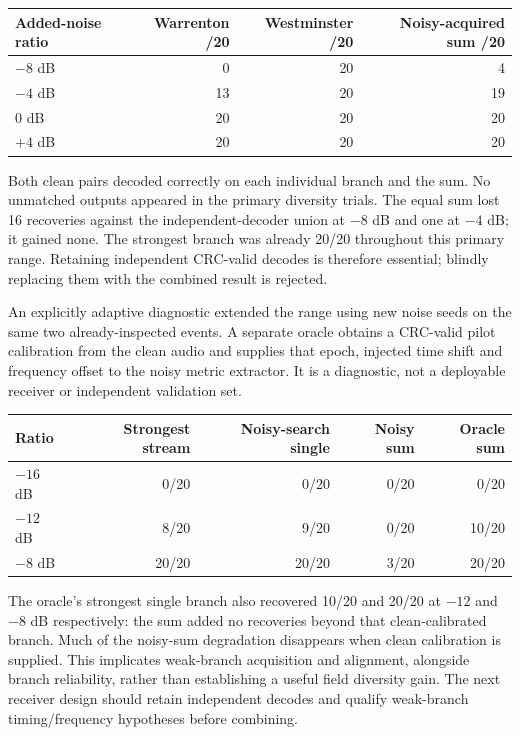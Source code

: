 \documentclass[11pt,a4paper]{article}
\begin{document}
\begin{center}
\begin{tabular}{lrrr}
\toprule
Added-noise ratio & Warrenton /20 & Westminster /20 & Noisy-acquired sum /20 \\
\midrule
$-8$ dB & 0 & 20 & 4 \\
$-4$ dB & 13 & 20 & 19 \\
0 dB & 20 & 20 & 20 \\
$+4$ dB & 20 & 20 & 20 \\
\bottomrule
\end{tabular}
\end{center}

Both clean pairs decoded correctly on each individual branch and the sum.
No unmatched outputs appeared in the primary diversity trials. The equal sum
lost 16 recoveries against the independent-decoder union at $-8$ dB and one
at $-4$ dB; it gained none. The strongest branch was already 20/20 throughout
this primary range. Retaining independent CRC-valid decodes is therefore
essential; blindly replacing them with the combined result is rejected.

An explicitly adaptive diagnostic extended the range using new noise seeds
on the same two already-inspected events. A separate oracle obtains a
CRC-valid pilot calibration from the clean audio and supplies that epoch,
injected time shift and frequency offset to the noisy metric extractor.
It is a diagnostic, not a deployable receiver or independent validation set.

\begin{center}
\begin{tabular}{lrrrr}
\toprule
Ratio & Strongest stream & Noisy-search single & Noisy sum & Oracle sum \\
\midrule
$-16$ dB & 0/20 & 0/20 & 0/20 & 0/20 \\
$-12$ dB & 8/20 & 9/20 & 0/20 & 10/20 \\
$-8$ dB & 20/20 & 20/20 & 3/20 & 20/20 \\
\bottomrule
\end{tabular}
\end{center}

The oracle's strongest single branch also recovered 10/20 and 20/20 at
$-12$ and $-8$ dB respectively: the sum added no recoveries beyond that
clean-calibrated branch. Much of the noisy-sum degradation disappears when
clean calibration is supplied. This implicates weak-branch acquisition and
alignment, alongside branch reliability, rather than establishing a useful
field diversity gain. The next receiver design should retain independent
decodes and qualify weak-branch timing/frequency hypotheses before combining.
\end{document}
